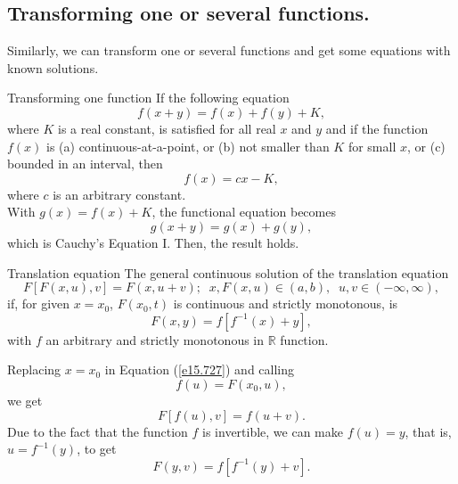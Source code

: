 \documentclass[
	11pt, %
	fleqn, %
	a4paper, %
]{LegrandOrangeBook}
\newcommand{\R}{\mathbb{R}}
\begin{document}
\subsection{Transforming one or several functions. }\label{s2.4}Similarly, we can transform one or several functions and get some equations with
known solutions.

\begin{example}{Transforming one function} If the following equation
\begin{displaymath}
    f(x+y)=f(x)+f(y)+K,
\end{displaymath}
where $K$ is a real constant, is satisfied for all real $x$ and
$y$ and if the function $f(x)$ is (a) continuous-at-a-point, or
(b) not smaller than $K$ for small $x$, or (c) bounded in an
interval, then
\begin{displaymath}
    f(x)=cx-K,
\end{displaymath}
where $c$ is an arbitrary constant.\\

 With $g(x)=f(x)+K$, the functional equation
becomes
\begin{displaymath}
g(x+y)=g(x)+g(y),
\end{displaymath}
which is Cauchy's Equation I. Then, the
result holds.
\end{example}

\begin{example}{Translation equation}\label{transequ} The general continuous
solution of the translation equation \begin{equation}\label{e15.727}
F[F(x,u),v]=F(x,u+v);\;\;x,F(x,u)\in (a,b),\;\;u,v\in (-\infty ,\infty ),
\end{equation}
if, for given $x=x_0$, $F(x_0,t)$ is continuous and strictly monotonous, is
\begin{equation}\label{e15.728}
F(x,y)=f[f^{-1}(x)+y],
\end{equation}
with $f$ an arbitrary and strictly monotonous in $\R$ function.

 Replacing $x=x_0$ in Equation
(\ref{e15.727}) and calling
\begin{displaymath}
f(u)=F(x_0,u),
\end{displaymath}
we get
\begin{displaymath}
F[f(u),v]=f(u+v).
\end{displaymath}
Due to the fact that the function $f$ is
invertible, we can make $f(u)=y$, that is, $u=f^{-1}(y)$, to get
\begin{displaymath}
F(y,v)=f[f^{-1}(y)+v].
\end{displaymath}
\end{example}
\end{document}
